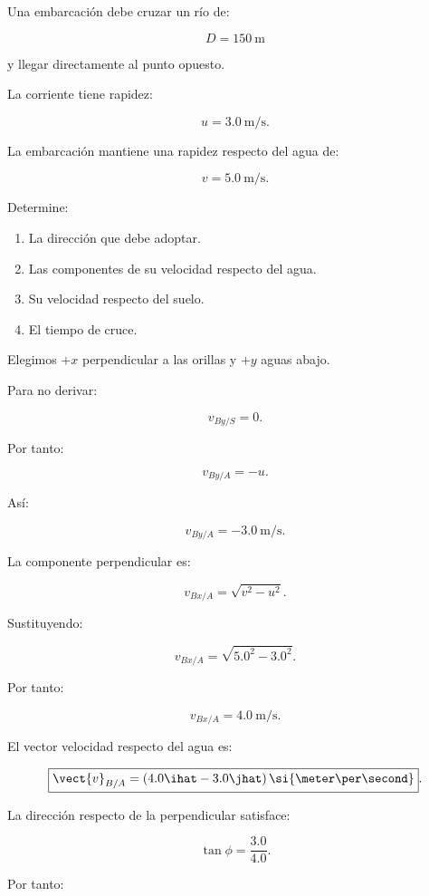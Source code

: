 \begin{ejemplo}

Una embarcación debe cruzar un río de:

\[
D=\SI{150}{\meter}
\]

y llegar directamente al punto opuesto.

La corriente tiene rapidez:

\[
u=\SI{3.0}{\meter\per\second}.
\]

La embarcación mantiene una rapidez respecto del agua de:

\[
v=\SI{5.0}{\meter\per\second}.
\]

Determine:

\begin{enumerate}[label=\alph*)]
    \item La dirección que debe adoptar.
    \item Las componentes de su velocidad respecto del agua.
    \item Su velocidad respecto del suelo.
    \item El tiempo de cruce.
\end{enumerate}

\end{ejemplo}

Elegimos \(+x\) perpendicular a las orillas
y \(+y\) aguas abajo.

Para no derivar:

\[
v_{By/S}=0.
\]

Por tanto:

\[
v_{By/A}=-u.
\]

Así:

\[
\boxed{
v_{By/A}=-\SI{3.0}{\meter\per\second}
}.
\]

La componente perpendicular es:

\[
v_{Bx/A}=\sqrt{v^2-u^2}.
\]

Sustituyendo:

\[
v_{Bx/A}=\sqrt{5.0^2-3.0^2}.
\]

Por tanto:

\[
\boxed{
v_{Bx/A}=\SI{4.0}{\meter\per\second}
}.
\]

El vector velocidad respecto del agua es:

\[
\boxed{
\vect{v}_{B/A}
=
(4.0\ihat-3.0\jhat)
\,\si{\meter\per\second}
}.
\]

La dirección respecto de la perpendicular satisface:

\[
\tan\phi=\frac{3.0}{4.0}.
\]

Por tanto:


